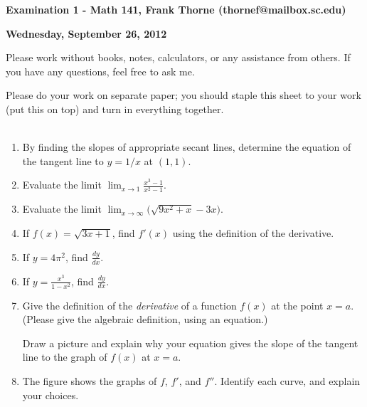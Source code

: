 \documentclass[12pt]{article}
\begin{document}
\setlength{\topmargin}{-2mm}





\begin{center}{\bf Examination 1 - Math 141, Frank Thorne (thornef@mailbox.sc.edu)}
\end{center}
\begin{center}
{\bf Wednesday, September 26, 2012}
\end{center}

Please work without books, notes, calculators, or any assistance from others. If you have
any questions, feel free to ask me. 

Please do your work on separate paper; you should staple this sheet to your work (put this on top)
and turn in everything together. 
\\
\\
\begin{enumerate}[(1)]
\item
By finding the slopes of appropriate secant lines, determine the equation of the tangent line
to $y = 1/x$ at $(1, 1)$.

\item
Evaluate the limit $\lim_{x \rightarrow 1} \frac{x^3 - 1}{x^2 - 1}.$

\item
Evaluate the limit $\lim_{x \rightarrow \infty} \big( \sqrt{9x^2 + x} - 3x \big).$

\item
If $f(x) = \sqrt{3x + 1}$, find $f'(x)$ using the definition of the derivative.

\item
If $y = 4 \pi^2$, find $\frac{dy}{dx}$.

\item
If $y = \frac{x^3}{1 - x^2}$, find $\frac{dy}{dx}$.

\item
Give the definition of the {\itshape derivative} of a function
$f(x)$ at the point $x = a$. (Please give the algebraic definition,
using an equation.)

Draw a picture and explain why your
equation gives the slope of the tangent line to the graph of $f(x)$
at $x = a$.

\item
The figure shows the graphs of $f$, $f'$, and $f''$. Identify each curve, and
explain your choices.

\end{enumerate}
\end{document}
